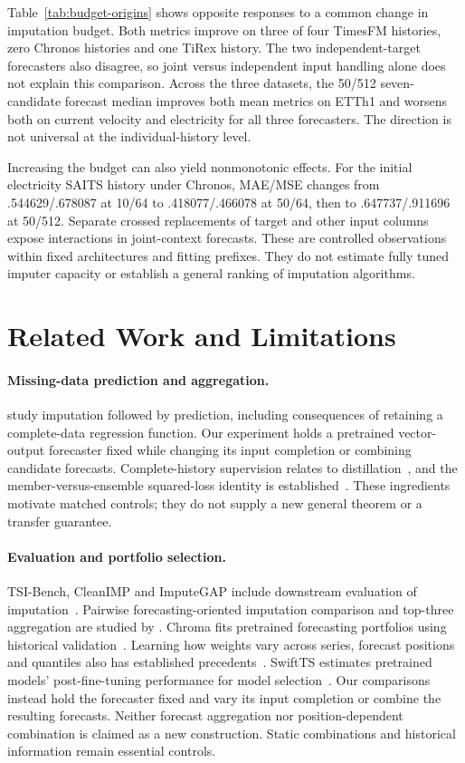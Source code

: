 \documentclass{article}
\begin{document}
Table~\ref{tab:budget-origins} shows opposite responses to a common change in imputation budget. Both metrics improve on three of four TimesFM histories, zero Chronos histories and one TiRex history. The two independent-target forecasters also disagree, so joint versus independent input handling alone does not explain this comparison. Across the three datasets, the 50/512 seven-candidate forecast median improves both mean metrics on ETTh1 and worsens both on current velocity and electricity for all three forecasters. The direction is not universal at the individual-history level.

Increasing the budget can also yield nonmonotonic effects. For the initial electricity SAITS history under Chronos, MAE/MSE changes from .544629/.678087 at 10/64 to .418077/.466078 at 50/64, then to .647737/.911696 at 50/512. Separate crossed replacements of target and other input columns expose interactions in joint-context forecasts. These are controlled observations within fixed architectures and fitting prefixes. They do not estimate fully tuned imputer capacity or establish a general ranking of imputation algorithms.

\section{Related Work and Limitations}

\paragraph{Missing-data prediction and aggregation.}
\citet{lemorvan2021good} study imputation followed by prediction, including consequences of retaining a complete-data regression function. Our experiment holds a pretrained vector-output forecaster fixed while changing its input completion or combining candidate forecasts. Complete-history supervision relates to distillation~\citep{menon2021statistical}, and the member-versus-ensemble squared-loss identity is established~\citep{krogh1994ensembles}. These ingredients motivate matched controls; they do not supply a new general theorem or a transfer guarantee.

\paragraph{Evaluation and portfolio selection.}
TSI-Bench, CleanIMP and ImputeGAP include downstream evaluation of imputation~\citep{du2024tsibench,cleanimp,nater2025imputegap}. Pairwise forecasting-oriented imputation comparison and top-three aggregation are studied by \citet{utama2026duel}. Chroma fits pretrained forecasting portfolios using historical validation~\citep{kayaalp2025chroma}. Learning how weights vary across series, forecast positions and quantiles also has established precedents~\citep{hasson2023ensembling}. SwiftTS estimates pretrained models' post-fine-tuning performance for model selection~\citep{zhang2025swiftts}. Our comparisons instead hold the forecaster fixed and vary its input completion or combine the resulting forecasts. Neither forecast aggregation nor position-dependent combination is claimed as a new construction. Static combinations and historical information remain essential controls.
\end{document}
